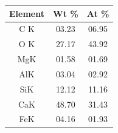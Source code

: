 \begin{minipage}{\textwidth}
\begin{minipage}[b]{0.32\textwidth}
    \label{fig:00-01-select}
  \end{minipage}
  \hfill
  \begin{minipage}[b]{0.32\textwidth}
    \centering
    \begin{tabular}{|c|c|c|}
      \hline
      Element & Wt \%  & At \%  \\ \hline
      C K     & 03.23 & 06.95 \\ \hline
      O K     & 27.17 & 43.92 \\ \hline
      MgK     & 01.58 & 01.69 \\ \hline
      AlK     & 03.04 & 02.92 \\ \hline
      SiK     & 12.12 & 11.16 \\ \hline
      CaK     & 48.70 & 31.43 \\ \hline
      FeK     & 04.16 & 01.93 \\ \hline
    \end{tabular}
    \label{tab:00-01}
  \end{minipage}
\end{minipage}




